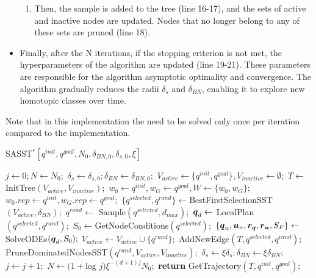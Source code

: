 \begin{itemize}
\begin{enumerate}
        \item Then, the sample is added to the tree (line 16-17), and the sets of active and inactive nodes are updated.
        Nodes that no longer belong to any of these sets are pruned (line 18).
    \end{enumerate}
    \item Finally, after the N iterations, if the stopping criterion is not met, the hyperparameters of the algorithm are updated (line 19-21).
    These parameters are responsible for the algorithm asymptotic optimality and convergence. 
    The algorithm gradually reduces the radii $\delta_s$ and $\delta_{BN}$, enabling it to explore new homotopic classes over time.
\end{itemize}

Note that in this implementation the  need to be solved only once per iteration compared to the  implementation.

\begin{algorithm}[t]
    \caption{SASST$^* [q^{init}, q^{goal}, N_0, \delta_{BN,0}, \delta_{s,0}, \xi]$}\label{alg:SASST*}
    \begin{algorithmic}[1]
        \State $j \gets 0; N \gets N_0;$
        \State $\delta_{s} \gets \delta_{s,0}; \delta_{BN} \gets \delta_{BN,0};$
        \State $V_{active} \gets \{q^{init}, q^{goal}\}, V_{inactive} \gets \emptyset;$
        \State $T \gets$ InitTree$(V_{active}, V_{inactive});$
        \State $w_0 \gets q^{init}, w_G \gets q^{goal}, W \gets \{w_0, w_G\};$
        \State $w_0.rep \gets q^{init}, w_G.rep \gets q^{goal};$
                \State $\{q^{selected}, q^{rand}\} \gets $BestFirstSelectionSST$(V_{active}, \delta_{BN});$
                \State $q^{rand} \gets$ Sample$(q^{selected}, d_{max});$
                \State $\boldsymbol{q}_d \gets$ LocalPlan$({q^{selected}},{q^{rand}});$
                \State $S_0 \gets $GetNodeConditions$({q^{selected}});$
                \State $\left \{\boldsymbol{q}_n, \boldsymbol{u}_n, \boldsymbol{r_q}, \boldsymbol{r_u}, S_F \right \}  \gets $SolveODEs$(\boldsymbol{q}_d, S_0);$
                        \State $V_{active} \gets V_{active} \cup \{q^{rand}\};$
                        \State AddNewEdge$(T, q^{selected}, q^{rand});$
                        \State PruneDominatedNodesSST$(q^{rand}, V_{active}, V_{inactive});$
                    \EndIf
                \EndIf
            \EndFor
            \State $\delta_s \gets \xi\delta_s; \delta_{BN}\gets\xi\delta_{BN};$
            \State $j \gets j+1;$
            \State $N \gets (1+$log $j)\xi^{-(d+1)j}N_0;$
        \EndWhile
        \State \textbf{return} GetTrajectory$(T, q^{init}, q^{goal})$;
    \end{algorithmic}
\end{algorithm}

